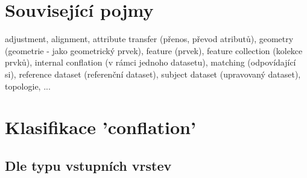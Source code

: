 \section{Související pojmy} %
\label{pojmy}

adjustment, alignment, attribute transfer (přenos, převod atributů), geometry (geometrie - jako geometrický prvek), feature (prvek), feature collection (kolekce prvků),
internal conflation (v rámci jednoho datasetu), matching (odpovídající si), reference dataset (referenční dataset), subject dataset (upravovaný dataset), topologie, ... 


\section{Klasifikace 'conflation'}
\label{klasifikace}

\subsection{Dle typu vstupních vrstev}

